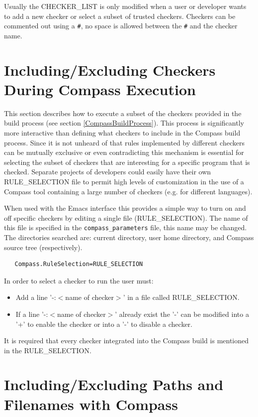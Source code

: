 Usually the CHECKER\_LIST is only modified when a user or developer wants to 
add a new checker or select a subset of trusted checkers.  Checkers can be
commented out using a {\tt \#}, no space is allowed between the {\tt \#} 
and the checker name.


\section{Including/Excluding Checkers During Compass Execution}
\label{ruleselection}

   This section describes how to execute a subset of the checkers provided in the build
process (see section \ref{CompassBuildProcess}). This process is significantly more
interactive than defining what checkers to include in the Compass build process.
Since it is not unheard of that rules implemented by different checkers can be  
mutually exclusive or even contradicting this mechanism is essential for selecting the
subset of checkers that are interesting for a specific program that is checked.
Separate projects of developers could easily have their own RULE\_SELECTION file
to permit high levels of customization in the use of a Compass tool containing
a large number of checkers (e.g. for different languages).

   When used with the Emacs interface this provides a simple way to turn on and off
specific checkers by editing a single file (RULE\_SELECTION).  The name of this
file is specified in the {\tt compass\_parameters} file, this name may be changed.
The directories searched are: current directory, user home directory, and Compass
source tree (respectively).

\begin{verbatim}
   Compass.RuleSelection=RULE_SELECTION
\end{verbatim}


In order to select a checker to run the user must:
\begin{itemize}
   \item Add a line '-:$<$name of checker$>$' in a file called RULE\_SELECTION. 
   \item If a line  '-:$<$name of checker$>$' already exist the '-' can be modified into
a '+' to enable the checker or into a '-' to disable a checker.
\end{itemize}
It is required that every checker integrated into the Compass build is mentioned in
the RULE\_SELECTION.


\section{Including/Excluding Paths and Filenames with Compass}

